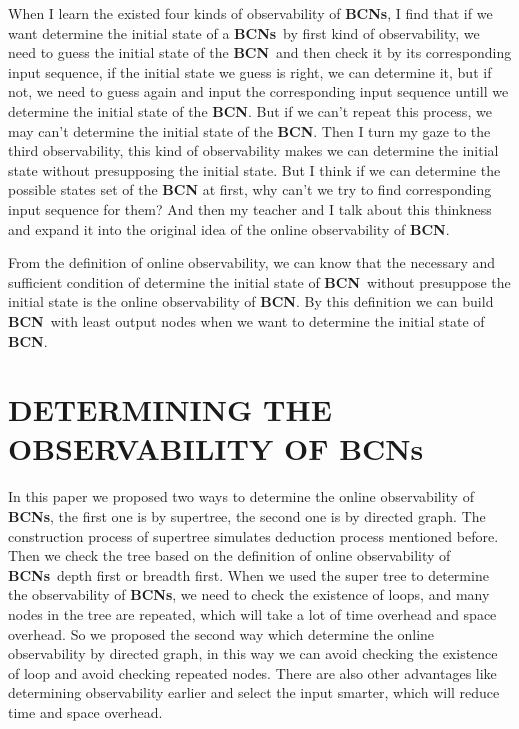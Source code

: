 \documentclass[letterpaper, 10 pt, conference]{ieeeconf}  %
\def \BCN {{\bf BCN}}
\def \BCNs {{\bf BCNs}}
\begin{document}
When I learn the existed four kinds of observability of {\bf BCNs}, I find that if we want determine the initial state of a \BCNs\ by first kind of observability, we need to guess the initial state of the \BCN\ and then check it by its corresponding input sequence, if the initial state we guess is right, we can determine it, but if not, we need to guess again and input the corresponding input sequence untill we determine the initial state of the {\bf BCN}. But if we can't repeat this process, we may can't determine the initial state of the {\bf BCN}. Then I turn my gaze to the third observability, this kind of observability makes we can determine the initial state without presupposing the initial state. But I think if we can determine the possible states set of the {\bf BCN} at first, why can't we try to find corresponding input sequence for them? And then my teacher and I talk about this thinkness and expand it into the original idea of the online observability of {\bf BCN}. 

From the definition of online observability, we can know that the necessary and sufficient condition of determine the initial state of \BCN\ without presuppose the initial state is the online observability of {\bf BCN}. By this definition we can build \BCN\ with least output nodes when we want to determine the initial state of {\bf BCN}.
\section{DETERMINING THE OBSERVABILITY OF BCNs}

In this paper we proposed two ways to determine the online observability of {\bf BCNs}, the first one is by supertree, the second one is by directed graph. The construction process of supertree simulates deduction process mentioned before. Then we check the tree based on the definition of online observability of \BCNs\ depth first or breadth first. When we used the super tree to determine the observability of {\bf BCNs}, we need to check the existence of loops, and many nodes in the tree are repeated, which will take a lot of time overhead and space overhead. So we proposed the second way which determine the online observability by directed graph,   in this way we can avoid checking the existence of loop and avoid checking repeated nodes. There are also other advantages like determining observability earlier and select the input smarter, which will reduce time and space overhead.    
\end{document}

